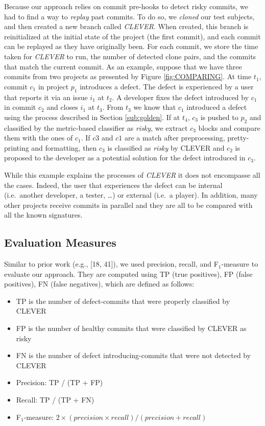 \documentclass[sigconf]{acmart}
\providecommand{\tightlist}{%
  \setlength{\itemsep}{0pt}\setlength{\parskip}{0pt}}
\begin{document}
Because our approach relies on commit pre-hooks to detect risky commits,
we had to find a way to \emph{replay} past commits. To do so, we
\emph{cloned} our test subjects, and then created a new branch called
\emph{CLEVER}. When created, this branch is reinitialized at the initial
state of the project (the first commit), and each commit can be replayed
as they have originally been. For each commit, we store the time taken
for \emph{CLEVER} to run, the number of detected clone pairs, and the
commits that match the current commit. As an example, suppose that we
have three commits from two projects as presented by Figure
\ref{fig:COMPARING}. At time \(t_1\), commit \(c_1\) in project \(p_1\)
introduces a defect. The defect is experienced by a user that reports it
via an issue \(i_1\) at \(t_2\). A developer fixes the defect introduced
by \(c_1\) in commit \(c_2\) and closes \(i_1\) at \(t_3\). From \(t_3\)
we know that \(c_1\) introduced a defect using the process described in
Section \ref{sub:golden}. If at \(t_4\), \(c_3\) is pushed to \(p_2\)
and classified by the metric-based classifier as \emph{risky}, we
extract \(c_3\) blocks and compare them with the ones of \(c_1\). If
\(c3\) and \(c1\) are a match after preprocessing, pretty-printing and
formatting, then \(c_3\) is classified as \emph{risky} by CLEVER and
\(c_2\) is proposed to the developer as a potential solution for the
defect introduced in \(c_3\).

While this example explains the processes of \emph{CLEVER} it does not
encompasse all the cases. Indeed, the user that experiences the defect
can be internal (i.e.~another developer, a tester, \ldots{}) or external
(i.e.~a player). In addition, many other projects receive commits in
parallel and they are all to be compared with all the known signatures.

\subsection{Evaluation Measures}\label{evaluation-measures}

Similar to prior work (e.g., [18, 41]), we used precision, recall,
and F\(_1\)-measure to evaluate our approach. They are computed using TP
(true positives), FP (false positives), FN (false negatives), which are
defined as follows:

\begin{itemize}
\tightlist
\item
  TP is the number of defect-commits that were properly classified by
  CLEVER
\item
  FP is the number of healthy commits that were classified by CLEVER as
  risky
\item
  FN is the number of defect introducing-commits that were not detected
  by CLEVER
\item
  Precision: TP / (TP + FP)
\item
  Recall: TP / (TP + FN)
\item
  F\(_1\)-measure:
  \(2 \times (precision \times recall)/(precision+recall)\)
\end{itemize}
\end{document}
